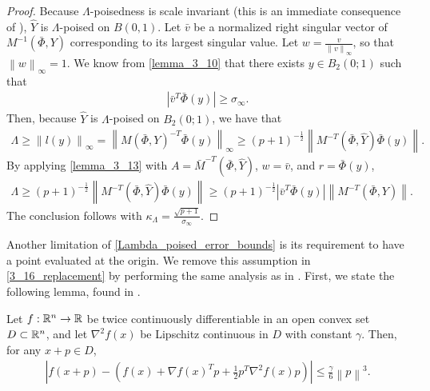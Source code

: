 \begin{proof}
Because $\Lambda$-poisedness is scale invariant (this is an immediate consequence of \cite[Lemma 3.8]{introduction_book}), 
$\hat Y$ is $\Lambda$-poised on $B(0, 1)$.
Let $\bar v$ be a normalized right singular vector of $M^{-1}\left(\bar \Phi, Y\right)$ corresponding to its largest singular value.
Let $w = \frac{v}{\left\|v\right\|_{\infty}}$, so that $\left\|w\right\|_{\infty} = 1$.
We know from \cref{lemma_3_10} that there exists $y \in B_2\left(0; 1\right)$ such that
\begin{align*}
\left| {\bar v}^T \bar {\Phi}(y) \right| \ge {\sigma_{\infty}}.
\end{align*}
Then, because $\hat Y$ is $\Lambda$-poised on $B_2(0; 1)$, we have that 
\begin{align*}
\Lambda 
\ge \left\|l(y)\right\|_{\infty} 
= \left\|M\left(\bar \Phi, Y\right)^{-T} \bar \Phi(y)\right\|_{\infty}
\ge \left(p+1\right)^{-\frac1 2 }\left\|M^{-T}\left(\bar \Phi, \hat Y\right) \bar{\Phi}(y)\right\|.
\end{align*}
By applying \cref{lemma_3_13} with $A={\bar M}^{-T}\left(\bar \Phi, \hat Y\right)$, $w = \bar v$, and $r = \bar \Phi(y)$,
\begin{align*}
\Lambda 
\ge \left(p+1\right)^{-\frac1 2 }\left\|M^{-T}\left(\bar \Phi, \hat Y\right) \bar{\Phi}(y)\right\|
\ge \left(p+1\right)^{-\frac1 2 }|\bar v^T \bar \Phi(y)| \left\|M^{-T}\left(\bar \Phi, Y\right)\right\|.
\end{align*}
The conclusion follows with $\kappa_{\Lambda} = \frac {\sqrt{p+1}}{\sigma_{\infty}}$.

\end{proof}


Another limitation of \cref{Lambda_poised_error_bounds} is its requirement to have a point evaluated at the origin.
We remove this assumption in \cref{3_16_replacement} by performing the same analysis as in \cite[Theorem 3.16]{introduction_book}.
First, we state the following lemma, found in \cite[Lemma 4.1.14]{dennisschnabel1983}.

\begin{theorem}
\label{4_1_14}
Let $f : \mathbb R^n \to \mathbb R$ be twice continuously differentiable in an open convex set $D \subset \mathbb R^n$,
and let $\nabla^2 f(x)$ be Lipschitz continuous in $D$ with constant $\gamma$.
Then, for any $x + p\in D$,
\begin{align*}
\left|f(x + p) - \left(f(x) + \nabla f(x)^T p + \frac 1 2 p^T \nabla^2 f(x)p\right) \right|
\le \frac {\gamma} 6 \left\|p\right\|^3.
\end{align*}
\end{theorem}

